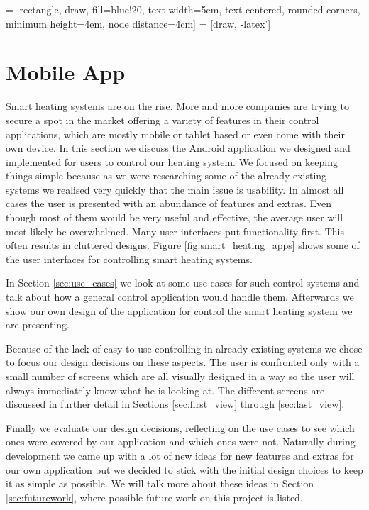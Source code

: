  = [rectangle, draw, fill=blue!20, 
    text width=5em, text centered, rounded corners, minimum height=4em, node distance=4cm]
 = [draw, -latex']

\chapter{Mobile App}
\label{sec:mobile_app}

Smart heating systems are on the rise. More and more companies are trying to secure a spot in the market offering a variety of features in their control applications, which are mostly mobile or tablet based or even come with their own device. In this section we discuss the Android application we designed and implemented for users to control our heating system. We focused on keeping things simple because as we were researching some of the already existing systems we realised very quickly that the main issue is usability. In almost all cases the user is presented with an abundance of features and extras. Even though most of them would be very useful and effective, the average user will most likely be overwhelmed. Many user interfaces put functionality first. This often results in cluttered designs. Figure \ref{fig:smart_heating_apps} shows some of the user interfaces for controlling smart heating systems.

In Section \ref{sec:use_cases} we look at some use cases for such control systems and talk about how a general control application would handle them. Afterwards we show our own design of the application for control the smart heating system we are presenting.

Because of the lack of easy to use controlling in already existing systems we chose to focus our design decisions on these aspects. The user is confronted only with a small number of screens which are all visually designed in a way so the user will always immediately know what he is looking at. The different screens are discussed in further detail in Sections \ref{sec:first_view} through \ref{sec:last_view}.

Finally we evaluate our design decisions, reflecting on the use cases to see which ones were covered by our application and which ones were not. Naturally during development we came up with a lot of new ideas for new features and extras for our own application but we decided to stick with the initial design choices to keep it as simple as possible. We will talk more about these ideas in Section \ref{sec:futurework}, where possible future work on this project is listed.

